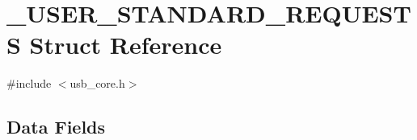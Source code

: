 \hypertarget{struct___u_s_e_r___s_t_a_n_d_a_r_d___r_e_q_u_e_s_t_s}{\section{\-\_\-\-U\-S\-E\-R\-\_\-\-S\-T\-A\-N\-D\-A\-R\-D\-\_\-\-R\-E\-Q\-U\-E\-S\-T\-S Struct Reference}
\label{struct___u_s_e_r___s_t_a_n_d_a_r_d___r_e_q_u_e_s_t_s}
}


{\ttfamily \#include $<$usb\-\_\-core.\-h$>$}

\subsection*{Data Fields}
